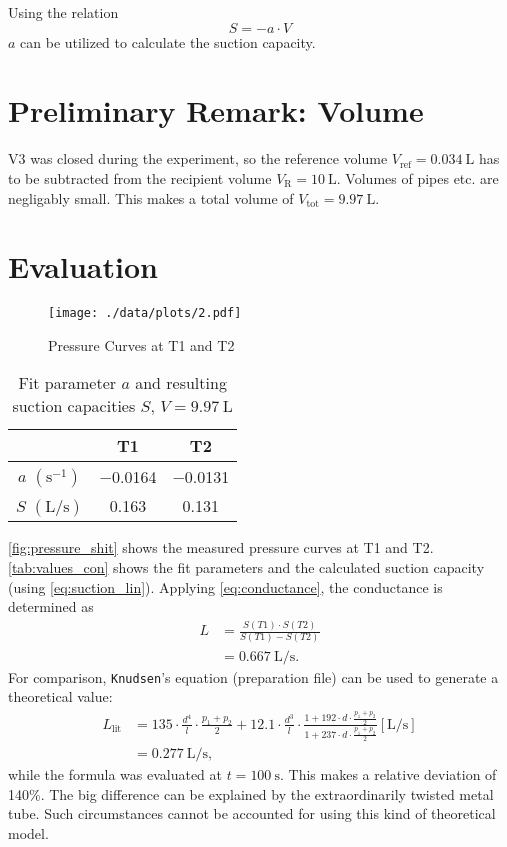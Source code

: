 Using the relation
\begin{equation}\label{eq:suction_lin}
	S=-a\cdot V
\end{equation}
$a$ can be utilized to calculate the suction capacity.

\section*{Preliminary Remark: Volume}
V3 was closed during the experiment, so the reference volume $V_\text{ref}=\SI{0.034}{\liter}$ has to be subtracted from the recipient volume $V_\text{R}=\SI{10}{\liter}$.
Volumes of pipes etc. are negligably small.
This makes a total volume of $V_\text{tot}=\SI{9.97}{\liter}$.

\section{Evaluation}
\begin{figure}[tbp]
	\centering
	\texttt{[image: ./data/plots/2.pdf]}
	\caption[Pressure Curves for T1 and T2]{Pressure Curves at T1 and T2}
	\label{fig:pressure_shit}
\end{figure}
\begin{table}[tbp]
	\centering
	\label{tab:values_con}
	\caption[Fit parameters and suction capacities]{Fit parameter $a$ and resulting suction capacities $S$, $V=\SI{9.97}{\liter}$}
	\begin{tabular}{S|SS}
		\toprule
		{}&	{T1}&	{T2}\\
		\midrule
		{$a$ $(\si{\second}^{-1})$}	&	\num{-0.0164}	&	\num{-0.0131}	\\
		{$S$ $(\si{\liter\per\second})$}	&	0.163	&	0.131	\\
		\bottomrule
	\end{tabular}
\end{table}
\autoref{fig:pressure_shit} shows the measured pressure curves at T1 and T2.
\autoref{tab:values_con} shows the fit parameters and the calculated suction capacity (using \autoref{eq:suction_lin}).
Applying \autoref{eq:conductance}, the conductance is determined as
\begin{align*}
	L &= \frac{S(T1)\cdot S(T2)}{S(T1)-S(T2)} \\
		&= \SI{0.667}{\liter\per\second}.
\end{align*}
For comparison, \texttt{Knudsen}'s equation (preparation file) can be used to generate a theoretical value:
\begin{align*}
	L_\text{lit} &= 135\cdot\frac{d^4}{l}\cdot\frac{p_1+p_2}{2}+\num{12.1}\cdot\frac{d^3}{l}\cdot\frac{1+192\cdot d\cdot\frac{p_1+p_2}{2}}{1+237\cdot d\cdot\frac{p_1+p_2}{2}} \left[\si{\liter\per\second}\right]	\\
	&=\SI{0.277}{\liter\per\second},
\end{align*}
while the formula was evaluated at $t=\SI{100}{\second}$.
This makes a relative deviation of \num{140}\%.
The big difference can be explained by the extraordinarily twisted metal tube.
Such circumstances cannot be accounted for using this kind of theoretical model.
